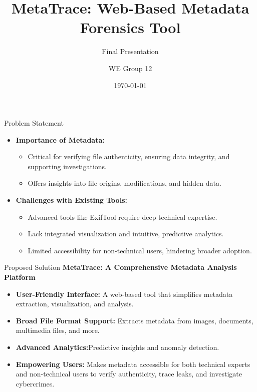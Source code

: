 \documentclass{beamer}
\title{MetaTrace: Web-Based Metadata Forensics Tool}
\subtitle{Final Presentation}
\author{WE Group 12}
\date{\today}
\begin{document}
\begin{frame}
    \titlepage
\end{frame}

\begin{frame}{Problem Statement}
    \begin{itemize}
        \item \textbf{Importance of Metadata:}
        \begin{itemize}
            \item Critical for verifying file authenticity, ensuring data integrity, and supporting investigations.
            \item Offers insights into file origins, modifications, and hidden data.
        \end{itemize}
        \item \textbf{Challenges with Existing Tools:}
        \begin{itemize}
            \item Advanced tools like ExifTool require deep technical expertise.
            \item Lack integrated visualization and intuitive, predictive analytics.
            \item Limited accessibility for non-technical users, hindering broader adoption.
        \end{itemize}
    \end{itemize}
\end{frame}

\begin{frame}{Proposed Solution}
    \textbf{MetaTrace: A Comprehensive Metadata Analysis Platform}
    \begin{itemize}
        \item \textbf{User-Friendly Interface:} A web-based tool that simplifies metadata extraction, visualization, and analysis.
        \item \textbf{Broad File Format Support:} Extracts metadata from images, documents, multimedia files, and more.
        \item \textbf{Advanced Analytics:}Predictive insights and anomaly detection.
        \item \textbf{Empowering Users:} Makes metadata accessible for both technical experts and non-technical users to verify authenticity, trace leaks, and investigate cybercrimes.
    \end{itemize}
\end{frame}
\end{document}
